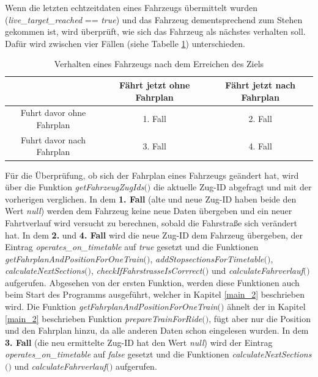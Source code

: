 Wenn die letzten \Gls{echtzeitdaten} eines Fahrzeugs übermittelt wurden (\textit{live\_target\_reached} == \textit{true}) und das Fahrzeug dementsprechend zum Stehen gekommen ist, wird überprüft, wie sich das Fahrzeug als nächstes verhalten soll. Dafür wird zwischen vier Fällen (siehe Tabelle \ref{table:vierfaelle}) unterschieden.
\begin{table}
\begin{center}
\renewcommand{\arraystretch}{1.2}
\begin{tabular}{c|c|c}
 & Fährt jetzt ohne Fahrplan & Fährt jetzt nach Fahrplan \\ \hline
Fuhrt davor ohne Fahrplan                 		&    1. Fall         & 2. Fall       \\ \hline
Fuhrt davor nach Fahrplan                   		&    3. Fall         & 4. Fall       \\ 
\end{tabular}
\renewcommand{\arraystretch}{1}
\caption{Verhalten eines Fahrzeugs nach dem Erreichen des Ziels}
\label{table:vierfaelle}
\end{center}
\end{table}
Für die Überprüfung, ob sich der Fahrplan eines Fahrzeugs geändert hat, wird über die Funktion \textit{getFahrzeugZugIds$($$)$} die aktuelle Zug-ID abgefragt und mit der vorherigen verglichen. In dem \textbf{1. Fall} (alte und neue Zug-ID haben beide den Wert \textit{null}) werden dem Fahrzeug keine neue Daten übergeben und ein neuer Fahrtverlauf wird versucht zu berechnen, sobald die Fahrstraße sich verändert hat. In dem \textbf{2.} und \textbf{4. Fall} wird die neue Zug-ID dem Fahrzeug übergeben, der Eintrag \textit{operates\_on\_timetable} auf \textit{true} gesetzt und die Funktionen \textit{getFahrplanAndPositionForOneTrain$($$)$}, \textit{addStopsectionsForTimetable$($$)$}, \textit{calculateNextSections$($$)$}, \textit{checkIfFahrstrasseIsCorrrect$($$)$} und \textit{calculateFahrverlauf$($$)$} aufgerufen. Abgesehen von der ersten Funktion, werden diese Funktionen auch beim Start des Programms ausgeführt, welcher in Kapitel \ref{main_2} beschrieben wird. Die Funktion \textit{get\-Fahrplan\-And\-Position\-For\-One\-Train$($$)$} ähnelt der in Kapitel \ref{main_2} beschrieben Funktion \textit{prepareTrainForRide$($$)$}, fügt aber nur die Position und den Fahrplan hinzu, da alle anderen Daten schon eingelesen wurden. In dem \textbf{3. Fall} (die neu ermittelte Zug-ID hat den Wert \textit{null}) wird der Eintrag \textit{operates\_on\_timetable} auf \textit{false} gesetzt und die Funktionen \textit{calculateNextSections$($$)$} und \textit{calculateFahrverlauf$($$)$} aufgerufen.
